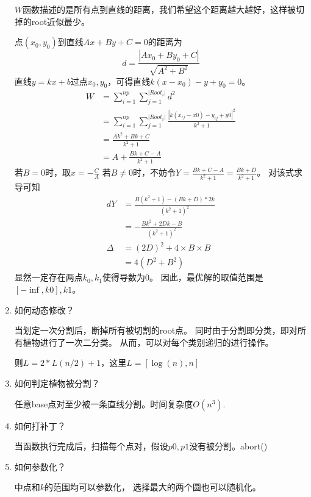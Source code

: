 \documentclass[UTF8]{ctexart}
\theoremstyle{definition}
\theoremstyle{remark}
\numberwithin{equation}{subsection}
\begin{document}
\begin{enumerate}[(1)]
		$W$函数描述的是所有点到直线的距离，我们希望这个距离越大越好，这样被切掉的root近似最少。
		
		点$(x_0, y_0)$到直线$Ax+By+C=0$的距离为
		\[
			d = \frac{|Ax_0 + By_0 + C|}{\sqrt{A^2+B^2}}
		\]
		直线$y=kx+b$过点$x_0, y_0$，可得直线$k(x-x_0)-y+y_0=0$。
		\begin{align*}
			W	&= \sum_{i=1}^{np}\sum_{j=1}^{|Root_i|} d^2	\\
				&= \sum_{i=1}^{np}\sum_{j=1}^{|Root_i|} \frac{|k(x_{ij}-x0) - y_{ij} + y0|^2}{k^2+1}	\\
				&= \frac{Ak^2 + Bk + C}{k^2+1}	\\
				&= A + \frac{Bk + C - A}{k^2+1}
		\end{align*}
		若$B = 0$时，取$x = - \frac{C}{A}$
		若$B \neq 0$时，不妨令$Y = \frac{Bk + C - A} {k^2+1} = \frac{Bk + D} {k^2+1}$。
		对该式求导可知
		\begin{align*}
			dY 	&= \frac{B(k^2+1) - (Bk+D)*2k} {(k^2+1)^2}	\\
				&= - \frac{Bk^2 + 2Dk - B} {(k^2+1)^2}	\\
			\Delta	&= (2D)^2 + 4 \times B \times B	\\
					&= 4(D^2 + B^2)
		\end{align*}
		显然一定存在两点$k_0, k_1$使得导数为0。
		因此，最优解的取值范围是$[-\inf, k0], k1$。
		
		\item 如何动态修改？
		
		当划定一次分割后，断掉所有被切割的root点。
		同时由于分割即分类，即对所有植物进行了一次二分类。
		从而，可以对每个类别递归的进行操作。
		
		则$L = 2*L(n/2) + 1$，这里$L = [\log(n), n]$
		
		\item 如何判定植物被分割？
		
		任意base点对至少被一条直线分割。时间复杂度$O(n ^ 3)$.
		
		\item 如何打补丁？
		
		当函数执行完成后，扫描每个点对，假设$p0, p1$没有被分割。abort()
		
		\item 如何参数化？
		
		中点和$k$的范围均可以参数化，
		选择最大的两个圆也可以随机化。
		
	\end{enumerate}
	
\end{document}
